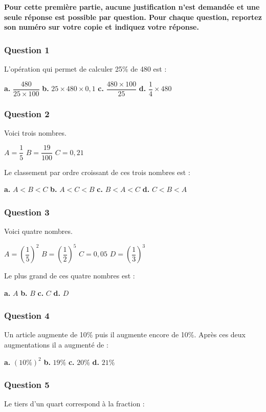 \textbf{Pour cette première partie, aucune justification n'est demandée et une seule réponse est possible par question. Pour chaque question, reportez son numéro sur votre copie et indiquez votre réponse.}

\subsubsection*{Question 1}
L'opération qui permet de calculer 25\% de 480 est :

\textbf{a.} $\dfrac{480}{25 \times 100}$ \hfill \textbf{b.} $25 \times 480 \times 0,1$ \hfill 
\textbf{c.} $\dfrac{480 \times 100}{25}$ \hfill \textbf{d.} $\dfrac{1}{4} \times 480$

\subsubsection*{Question 2}
Voici trois nombres.

$A = \dfrac{1}{5}$ \hfill $B = \dfrac{19}{100}$ \hfill $C = 0,21$

Le classement par ordre croissant de ces trois nombres est :

\textbf{a.} $A < B < C$ \hfill \textbf{b.} $A < C < B$ \hfill 
\textbf{c.} $B < A < C$ \hfill \textbf{d.} $C < B < A$

\subsubsection*{Question 3}
Voici quatre nombres.

$A = \left(\dfrac{1}{5}\right)^2$ \hfill $B = \left(\dfrac{1}{2}\right)^5$ \hfill $C = 0,05$ \hfill $D = \left(\dfrac{1}{3}\right)^3$

Le plus grand de ces quatre nombres est :

\textbf{a.} $A$ \hfill \textbf{b.} $B$ \hfill \textbf{c.} $C$ \hfill \textbf{d.} $D$

\subsubsection*{Question 4}
Un article augmente de 10\% puis il augmente encore de 10\%. Après ces deux augmentations il a augmenté de :

\textbf{a.} $(10\%)^2$ \hfill \textbf{b.} $19\%$ \hfill \textbf{c.} $20\%$ \hfill \textbf{d.} $21\%$

\subsubsection*{Question 5}
Le tiers d'un quart correspond à la fraction :

